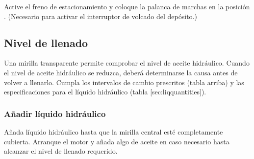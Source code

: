 \stopsection



\item Active el freno de estacionamiento y coloque la palanca de marchas en la posición . (Necesario para activar el interruptor de volcado del depósito.)



\subsection[niveau_hydrau]{Nivel de llenado}

Una mirilla transparente permite comprobar el nivel de aceite hidráulico.
Cuando el nivel de aceite hidráulico se reduzca, deberá determinarse la causa antes de volver a llenarlo. Cumpla los intervalos de cambio prescritos (tabla arriba) y las especificaciones para el líquido hidráulico (tabla [sec:liqquantities]).


\subsubsection{Añadir líquido hidráulico}

Añada líquido hidráulico hasta que la mirilla central esté completamente cubierta.
Arranque el motor y añada algo de aceite en caso necesario hasta alcanzar el nivel de llenado requerido.
